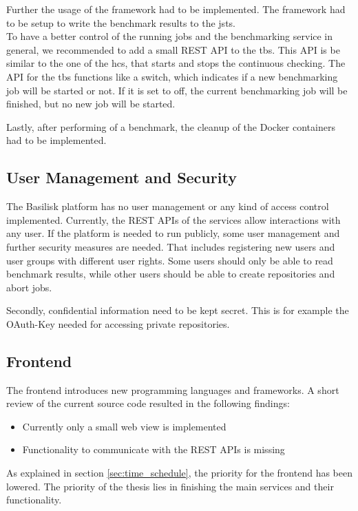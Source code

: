 Further the usage of the \iguana{} framework had to be implemented.
The framework had to be setup to write the benchmark results to the \acl{jsts}.
\\

To have a better control of the running jobs and the benchmarking service in general, we recommended to add a small REST API to the \ac{tbs}.
This API is be similar to the one of the \ac{hcs}, that starts and stops the continuous checking.
The API for the \ac{tbs} functions like a switch, which indicates if a new benchmarking job will be started or not.
If it is set to off, the current benchmarking job will be finished, but no new job will be started.

Lastly, after performing of a benchmark, the cleanup of the Docker containers had to be implemented.

\subsection{User Management and Security}
\label{sec:review_user_management}
The Basilisk platform has no user management or any kind of access control implemented.
Currently, the REST APIs of the services allow interactions with any user.
If the platform is needed to run publicly, some user management and further security measures are needed.
That includes registering new users and user groups with different user rights.
Some users should only be able to read benchmark results, while other users should be able to create repositories and abort jobs.

Secondly, confidential information need to be kept secret.
This is for example the OAuth-Key needed for accessing private \gh{} repositories.


\subsection{Frontend}
\label{sec:review_frontend}
The frontend introduces new programming languages and frameworks.
A short review of the current source code resulted in the following findings:
\begin{itemize}
	\item Currently only a small web view is implemented
	\item Functionality to communicate with the REST APIs is missing
\end{itemize}


As explained in section \ref{sec:time_schedule}, the priority for the frontend has been lowered.
The priority of the thesis lies in finishing the main services and their functionality.

